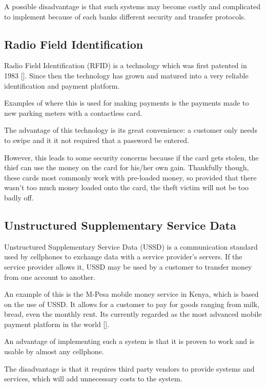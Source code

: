 A possible disadvantage is that such systems may become costly and complicated to implement
because of each banks different security and transfer protocols.

\subsection{Radio Field Identification}

Radio Field Identification (RFID) is a technology which was first patented in 1983
[\cite{patent:nfc-patent}]. Since then the technology has grown and matured into a very
reliable identification and payment platform. 

Examples of where this is used for making payments is the payments made to new parking meters
with a contactless card. 

The advantage of this technology is its great convenience: a customer only needs to swipe and
it it not required that a password be entered.

However, this leads to some security concerns because if the card gets stolen, the thief can
use the money on the card for his/her own gain. Thankfully though, these cards most commonly
work with pre-loaded money, so provided that there wasn't too much money loaded onto the card,
the theft victim will not be too badly off. 

\subsection{Unstructured Supplementary Service Data}

Unstructured Supplementary Service Data (USSD) is a communication standard used by cellphones
to exchange data with a service provider's servers. If the service provider allows it, USSD may
be used by a customer to transfer money from one account to another. 

An example of this is the M-Pesa mobile money service in Kenya, which is based on the use of
USSD. It allows for a customer to pay for goods ranging from milk, bread, even the monthly
rent. Its currently regarded as the most advanced mobile payment platform in the world
[\cite{journal:m-pesa}]. 

An advantage of implementing such a system is that it is proven to work and is usable by almost
any cellphone.

The disadvantage is that it requires third party vendors to provide systems and services, which
will add unnecessary costs to the system.

